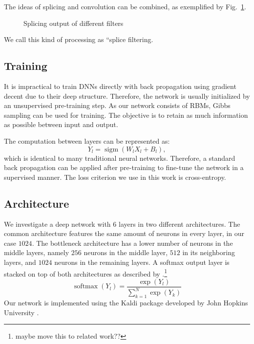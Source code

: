 \documentclass{article}
\DeclareMathOperator*{\sigm}{sigm}
\DeclareMathOperator*{\softmax}{softmax}
\begin{document}
The ideas of splicing and convolution can be combined, as exemplified by Fig.~\ref{fig:filtersplice}.
\begin{figure}
 \centerline{}
 \caption{Splicing output of different filters}
 \label{fig:filtersplice}
\end{figure}
We call this kind of processing as ``splice filtering. 
 
\subsection{Training}\label{sec:train}
It is impractical to train DNNs directly with back propagation using gradient decent due to their deep structure. Therefore, the network is usually initialized by an unsupervised pre-training step. As our network consists of RBMs, Gibbs sampling can be used for training. The objective is to retain as much information as possible between input and output. 

The computation between layers can be represented as:
\begin{equation}\label{dbn}
Y_{l} = \sigm(W_{l}X_{l} + B_{l}) ,
\end{equation}  
which is identical to many traditional neural networks. Therefore, a standard back propagation can be applied after pre-training to fine-tune the network in a supervised manner. The loss criterion we use in this work is cross-entropy.  

\subsection{Architecture}\label{sec:arch}
We investigate a deep network with $6$ layers in two different architectures. The common architecture features the same amount of neurons in every layer, in our case $1024$. The bottleneck architecture has a lower number of neurons in the middle layers, namely $256$ neurons in the middle layer, $512$ in its neighboring layers, and $1024$ neurons in the remaining layers\cite{grezl2007probabilistic}.
A softmax output layer is stacked on top of both architectures as described by .\footnote{maybe move this to related work??}
\begin{equation}\label{softmax}
\softmax(Y_{l}) = \frac{\exp(Y_{l})}{\sum_{k=1}^N \exp(Y_{k})}
\end{equation}
Our network is implemented using the Kaldi package developed by John Hopkins University \cite{povey2011kaldi}.
 
\end{document}
